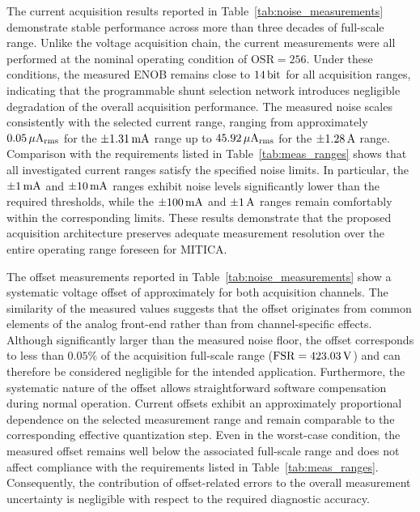The current acquisition results reported in Table~\ref{tab:noise_measurements} demonstrate stable performance across more than three decades of full-scale range. Unlike the voltage acquisition chain, the current measurements were all performed at the nominal operating condition of $\mathrm{OSR}=256$. Under these conditions, the measured ENOB remains close to $14 \, \mathrm{bit}$ for all acquisition ranges, indicating that the programmable shunt selection network introduces negligible degradation of the overall acquisition performance. The measured noise scales consistently with the selected current range, ranging from approximately $0.05 \, \mathrm{\mu A_{rms}}$ for the $\pm1.31 \, \mathrm{mA}$ range up to $45.92 \, \mathrm{\mu A_{rms}}$ for the $\pm1.28 \, \mathrm{A}$ range. Comparison with the requirements listed in Table~\ref{tab:meas_ranges} shows that all investigated current ranges satisfy the specified noise limits. In particular, the $\pm1 \, \mathrm{mA}$ and $\pm10 \, \mathrm{mA}$ ranges exhibit noise levels significantly lower than the required thresholds, while the $\pm100 \, \mathrm{mA}$ and $\pm1 \, \mathrm{A}$ ranges remain comfortably within the corresponding limits. These results demonstrate that the proposed acquisition architecture preserves adequate measurement resolution over the entire operating range foreseen for MITICA.

The offset measurements reported in Table~\ref{tab:noise_measurements} show a systematic voltage offset of approximately  for both acquisition channels. The similarity of the measured values suggests that the offset originates from common elements of the analog front-end rather than from channel-specific effects. Although significantly larger than the measured noise floor, the offset corresponds to less than $0.05\%$ of the acquisition full-scale range ($\mathrm{FSR}=423.03 \, \mathrm{V}$) and can therefore be considered negligible for the intended application. Furthermore, the systematic nature of the offset allows straightforward software compensation during normal operation. Current offsets exhibit an approximately proportional dependence on the selected measurement range and remain comparable to the corresponding effective quantization step. Even in the worst-case condition, the measured offset remains
well below the associated full-scale range and does not affect compliance with the requirements listed in Table~\ref{tab:meas_ranges}. Consequently, the contribution of offset-related errors to the overall measurement uncertainty is negligible with respect to the required diagnostic accuracy.

